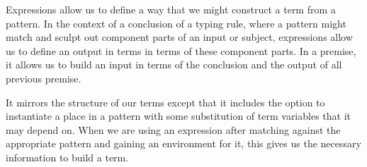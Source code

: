
Expressions allow us to define a way that we might construct a term from a
pattern. In the context of a conclusion of a typing rule, where a pattern
might match and sculpt out component parts of an input or subject,
expressions allow us to define an output in terms in terms of these component
parts. In a premise, it allows us to build an input in terms of the
conclusion and the output of all previous premise.

It mirrors the structure of our terms except that it includes the option
to instantiate a place in a pattern with some substitution of term variables
that it may depend on. When we are using an expression after matching against
the appropriate pattern and gaining an environment for it, this gives us the
necessary information to build a term.

